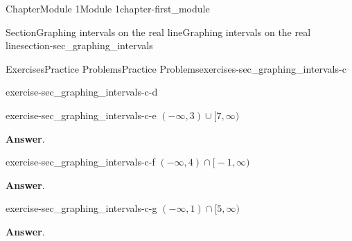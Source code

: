 \documentclass[oneside,10pt,]{book}
\newcommand{\blocktitlefont}{\relax}
\begin{document}
\begin{chapterptx}{Chapter}{Module 1}{}{Module 1}{}{}{chapter-first_module}
\begin{sectionptx}{Section}{Graphing intervals on the real line}{}{Graphing intervals on the real line}{}{}{section-sec_graphing_intervals}
\begin{exercises-subsection-numberless}{Exercises}{Practice Problems}{}{Practice Problems}{}{}{exercises-sec_graphing_intervals-c}
\begin{divisionexercise}{2}{}{}{exercise-sec_graphing_intervals-c-d}
\end{divisionexercise}%
\begin{divisionexercise}{3}{}{}{exercise-sec_graphing_intervals-c-e}%
\(( - \infty, 3 ) \cup \big[ 7, \infty )\)\par\smallskip%
\noindent\textbf{\blocktitlefont Answer}.\hypertarget{answer-sec_graphing_intervals-c-e-b}{}\quad{}\begin{image}{0}{1}{0}{}%
%
\end{image}%
%
\end{divisionexercise}%
\begin{divisionexercise}{4}{}{}{exercise-sec_graphing_intervals-c-f}%
\(( - \infty, 4 ) \cap \big[ -1, \infty )\)\par\smallskip%
\noindent\textbf{\blocktitlefont Answer}.\hypertarget{answer-sec_graphing_intervals-c-f-b}{}\quad{}\begin{image}{0}{1}{0}{}%
%
\end{image}%
%
\end{divisionexercise}%
\begin{divisionexercise}{5}{}{}{exercise-sec_graphing_intervals-c-g}%
\(( - \infty, 1 ) \cap \big[ 5, \infty )\)\par\smallskip%
\noindent\textbf{\blocktitlefont Answer}.\hypertarget{answer-sec_graphing_intervals-c-g-b}{}\quad{}\begin{image}{0}{1}{0}{}%

\end{image}
\end{divisionexercise}
\end{exercises-subsection-numberless}
\end{sectionptx}
\end{chapterptx}
\end{document}
